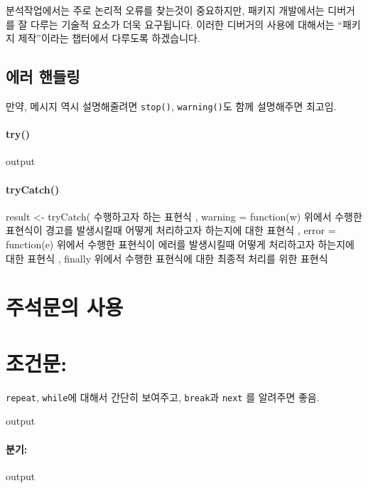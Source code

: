 \documentclass{report}
\begin{document}
분석작업에서는 주로 논리적 오류를 찾는것이 중요하지만, 패키지 개발에서는 디버거를 잘 다루는 기술적 요소가 더욱 요구됩니다. 
이러한 디버거의 사용에 대해서는 ``패키지 제작''이라는 챕터에서 다루도록 하겠습니다.

\subsection{에러 핸들링}
	만약, 메시지 역시 설명해줄려면  \texttt{stop()}, \texttt{warning()}도 함께 설명해주면 최고임.  
\paragraph{try()}
\begin{Schunk}
\begin{Soutput}
output
\end{Soutput}
\end{Schunk}

\paragraph{tryCatch()}

\begin{Schunk}
\begin{Soutput}
result <- tryCatch(
{
	수행하고자 하는 표현식
},
warning = function(w) {
	위에서 수행한 표현식이 경고를 발생시킬때 어떻게 처리하고자 하는지에 대한 표현식
},
error = function(e) {
	위에서 수행한 표현식이 에러를 발생시킬때 어떻게 처리하고자 하는지에 대한 표현식
}, finally {
	위에서 수행한 표현식에 대한 최종적 처리를 위한 표현식
}
\end{Soutput}
\end{Schunk}


\section{주석문의 사용}


\section{조건문:}
\texttt{repeat}, \texttt{while}에 대해서 간단히 보여주고, \texttt{break}과 \texttt{next} 를 알려주면 좋음. 
\begin{Schunk}
\begin{Soutput}
output
\end{Soutput}
\end{Schunk}


\paragraph{분기:}
\begin{Schunk}
\begin{Soutput}
output
\end{Soutput}
\end{Schunk}
\end{document}
